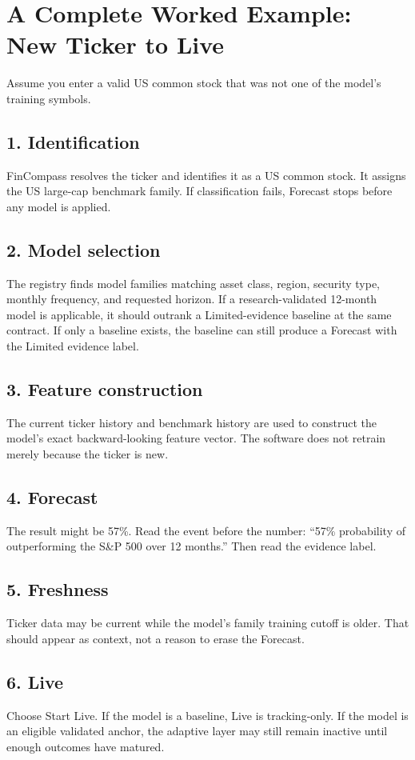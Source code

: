 \documentclass[11pt]{article}
\begin{document}
\section{A Complete Worked Example: New Ticker to Live}
Assume you enter a valid US common stock that was not one of the model's training symbols.

\subsection{1. Identification}
FinCompass resolves the ticker and identifies it as a US common stock. It assigns the US large-cap benchmark family. If classification fails, Forecast stops before any model is applied.

\subsection{2. Model selection}
The registry finds model families matching asset class, region, security type, monthly frequency, and requested horizon. If a research-validated 12-month model is applicable, it should outrank a Limited-evidence baseline at the same contract. If only a baseline exists, the baseline can still produce a Forecast with the Limited evidence label.

\subsection{3. Feature construction}
The current ticker history and benchmark history are used to construct the model's exact backward-looking feature vector. The software does not retrain merely because the ticker is new.

\subsection{4. Forecast}
The result might be 57\%. Read the event before the number: ``57\% probability of outperforming the S\&P 500 over 12 months.'' Then read the evidence label.

\subsection{5. Freshness}
Ticker data may be current while the model's family training cutoff is older. That should appear as context, not a reason to erase the Forecast.

\subsection{6. Live}
Choose Start Live. If the model is a baseline, Live is tracking-only. If the model is an eligible validated anchor, the adaptive layer may still remain inactive until enough outcomes have matured.
\end{document}
